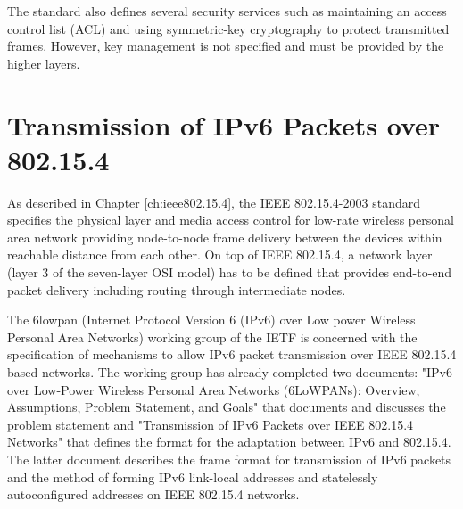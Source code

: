 \documentclass[12pt, titlepage, a4paper]{report}
\begin{document}
The standard also defines several security services such as maintaining an access control list (ACL) and
using symmetric-key cryptography to protect transmitted frames. However, key management is not specified and must be provided by the higher layers.

\chapter{Transmission of IPv6 Packets over 802.15.4}\label{ch:6lowpan}
As described in Chapter \ref{ch:ieee802.15.4}, the IEEE 802.15.4-2003 standard specifies the physical layer and media access control for low-rate wireless personal area network providing node-to-node frame delivery between the devices within reachable distance from each other. On top of IEEE 802.15.4, a network layer (layer 3 of the seven-layer OSI model) has to be defined that provides end-to-end packet delivery including routing through intermediate nodes.


The 6lowpan (Internet Protocol Version 6 (IPv6) over Low power Wireless Personal Area Networks) working group of the IETF is concerned with the specification of mechanisms to allow IPv6 packet transmission over IEEE 802.15.4 based networks. The working group has already completed two documents: "IPv6 over Low-Power Wireless Personal Area Networks (6LoWPANs): Overview, Assumptions, Problem Statement, and Goals" \cite{rfc4919} that documents and discusses the problem statement and "Transmission of IPv6 Packets over IEEE 802.15.4 Networks" \cite{rfc4944} that defines the format for the adaptation between IPv6 and 802.15.4. The latter document describes the frame format for transmission of IPv6 packets and the method of forming IPv6 link-local addresses and statelessly autoconfigured addresses on IEEE 802.15.4 networks.

\end{document}
